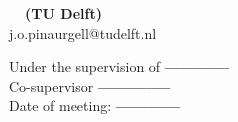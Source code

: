 \begin{titlepage}

\begin{center}

\vspace*{2\bigskipamount}

{\makeatletter
\titlestyle\bfseries\LARGE\@title
\makeatother}

{\makeatletter
\ifx\@subtitle\undefined\else
    \bigskip
    \titlefont\titleshape\Large\@subtitle
\fi
\makeatother}

\vfill


\makeatletter
{\Large\titlefont\bfseries\@firstname\ {\titleshape\@lastname \  (TU Delft)}}\\
\vspace{0.15cm}
{\large j.o.pinaurgell@tudelft.nl}

\bigskip
\bigskip

\begin{flushright}
Under the supervision of \textbf{------------}  \\
Co-supervisor \textbf{--------------} \\
Date of meeting: \textbf{------------} 
\end{flushright}
\vspace*{2\bigskipamount}

\end{center}

\cleardoublepage


\end{titlepage}

